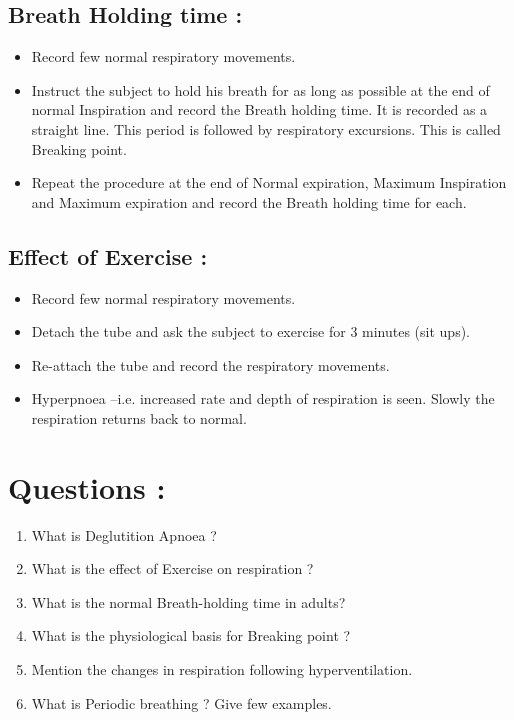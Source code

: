 \documentclass[a4paper,12pt,openany,oneside]{book}
\begin{document}
\subsection*{Breath Holding time :}
\begin{itemize}
\item{Record few normal respiratory movements.}
\item{Instruct the subject to hold his breath for as long as possible at the end of normal Inspiration and record the Breath holding time. It is recorded as a straight line. This period is followed by respiratory excursions. This is called Breaking point.}
\item{Repeat the procedure at the end of Normal expiration, Maximum Inspiration and Maximum expiration and record the Breath holding time for each.}
\end{itemize}

\subsection*{Effect of Exercise :}
\begin{itemize}
\item{Record few normal respiratory movements.}
\item{Detach the tube and ask the subject to exercise for 3 minutes (sit ups).}
\item{Re-attach the tube and record the respiratory movements.}
\item{Hyperpnoea –i.e. increased rate and depth of respiration is seen. Slowly the respiration returns back to normal.}
\end{itemize}

\section*{Questions :}
\begin{enumerate}
		\itemsep0em
\item{What is Deglutition Apnoea ?}
\item{What is the effect of Exercise on respiration ?}
\item{What is the normal Breath-holding time in adults?}
\item{What is the physiological basis for Breaking point ?}
\item{Mention the changes in respiration following hyperventilation.}
\item{What is Periodic breathing ? Give few examples.}
\end{enumerate}
\end{document}
